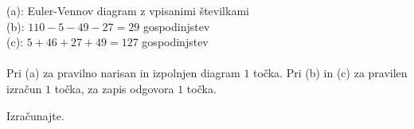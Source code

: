 \documentclass[addpoints,12pt]{exam}
\begin{document}
\begin{questions}
    \begin{solution}[8.5cm]
        (a): Euler-Vennov diagram z vpisanimi številkami \\
        (b): $110-5-49-27=29$ gospodinjstev\\
        (c): $5+46+27+49=127$ gospodinjstev \\ \\
        Pri (a) za pravilno narisan in izpolnjen diagram $1$ točka. Pri (b) in (c) za pravilen izračun $1$ točka, za zapis odgovora $1$ točka.
    \end{solution}




      \newpage
        



    











    
    \question
    Izračunajte.
\begin{parts}


\end{parts}
\end{questions}
\end{document}
